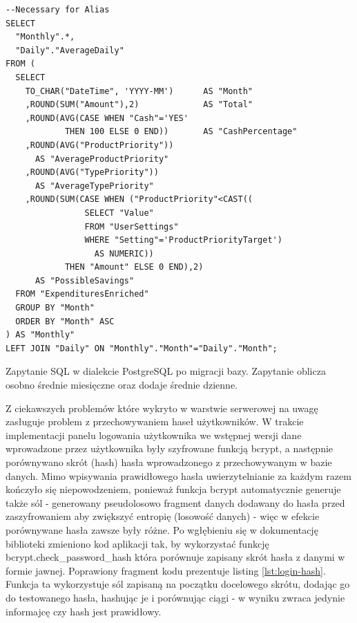 \documentclass[a4paper,10pt, twoside]{report}
\begin{document}
\begin{large}
\begin{minipage}{\textwidth}
\begin{lstlisting}
--Necessary for Alias
SELECT 
  "Monthly".*, 
  "Daily"."AverageDaily"
FROM (
  SELECT
    TO_CHAR("DateTime", 'YYYY-MM')      AS "Month"
    ,ROUND(SUM("Amount"),2)             AS "Total"
    ,ROUND(AVG(CASE WHEN "Cash"='YES'
            THEN 100 ELSE 0 END))       AS "CashPercentage"
    ,ROUND(AVG("ProductPriority"))
      AS "AverageProductPriority"
    ,ROUND(AVG("TypePriority"))
      AS "AverageTypePriority"
    ,ROUND(SUM(CASE WHEN ("ProductPriority"<CAST((
                SELECT "Value"
                FROM "UserSettings"
                WHERE "Setting"='ProductPriorityTarget')
                  AS NUMERIC))
            THEN "Amount" ELSE 0 END),2)
      AS "PossibleSavings"
  FROM "ExpendituresEnriched" 
  GROUP BY "Month"
  ORDER BY "Month" ASC
) AS "Monthly"
LEFT JOIN "Daily" ON "Monthly"."Month"="Daily"."Month";\end{lstlisting}
\end{minipage}
{Zapytanie SQL w dialekcie PostgreSQL po migracji bazy. Zapytanie oblicza osobno
 średnie miesięczne oraz dodaje średnie dzienne.}

{Z ciekawszych problemów które wykryto w warstwie serwerowej na uwagę zasługuje 
problem z przechowywaniem haseł użytkowników. W trakcie implementacji panelu 
logowania użytkownika we wstępnej wersji dane wprowadzone przez użytkownika 
były szyfrowane funkcją bcrypt, a następnie porównywano skrót (hash) hasła 
wprowadzonego z przechowywanym w bazie danych. Mimo wpisywania prawidłowego 
hasła uwierzytelnianie za każdym razem kończyło się niepowodzeniem, ponieważ 
funkcja bcrypt automatycznie generuje także sól - generowany pseudolosowo 
fragment danych dodawany do hasła przed zaszyfrowaniem aby zwiększyć entropię 
(losowość danych) - więc w efekcie porównywane hasła zawsze były różne. Po 
wgłębieniu się w dokumentację biblioteki zmieniono kod aplikacji tak, by 
wykorzystać funkcję bcrypt.check\_password\_hash która porównuje zapisany skrót 
hasła z danymi w formie jawnej. Poprawiony fragment kodu prezentuje listing 
\ref{lst:login-hash}. Funkcja ta wykorzystuje sól zapisaną na początku 
docelowego skrótu, dodając go do testowanego hasła, hashując je i porównując 
ciągi - w wyniku zwraca jedynie informajcę czy hash jest prawidłowy.}


\end{large}
\end{document}
